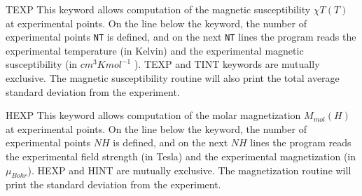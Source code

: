 \begin{keywordlist}
\item[TEXP]
This keyword allows computation of the magnetic susceptibility $\chi T(T)$ at experimental points.
On the line below the keyword, the number of experimental points \texttt{NT} is defined, and on
the next \texttt{NT} lines the program reads the experimental temperature (in Kelvin) and the
experimental magnetic susceptibility (in $cm^3Kmol^{-1}$ ).
TEXP and TINT keywords are mutually exclusive. The magnetic susceptibility
routine will also print the total average standard deviation from the experiment.






\item[HEXP]
This keyword allows computation of the molar magnetization $M_{mol} (H)$ at experimental points.
On the line below the keyword, the number of experimental points $NH$ is defined, and on the next $NH$ lines
the program reads the experimental field strength (in Tesla) and the experimental magnetization (in $\mu_{Bohr}$).
HEXP and HINT are mutually exclusive. The magnetization routine will print the standard deviation from the experiment.






\end{keywordlist}
